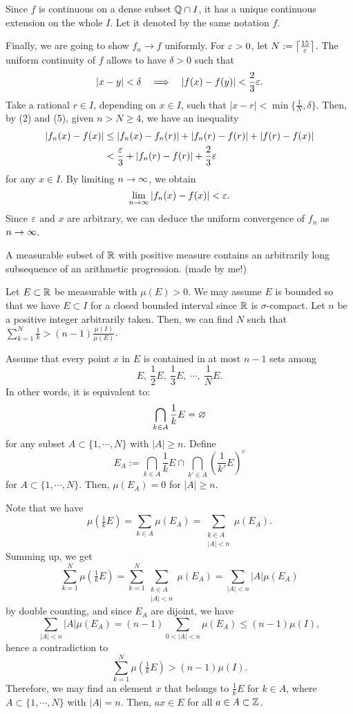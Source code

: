 \documentclass[11pt]{article}
\begin{document}
\begin{sol}
Since $f$ is continuous on a dense subset $\mathbb{Q}\cap I$, it has a unique continuous extension on the whole $I$.
Let it denoted by the same notation $f$.

\Step[4]
Finally, we are going to show $f_n\to f$ uniformly.
For $\varepsilon>0$, let $N:=\left\lceil\frac{15}{\varepsilon}\right\rceil$.
The uniform continuity of $f$ allows to have $\delta>0$ such that
\begin{align}|x-y|<\delta\impl|f(x)-f(y)|<\frac23\e.\end{align}
Take a rational $r\in I$, depending on $x\in I$, such that $|x-r|<\min\{\frac1N,\delta\}$.
Then, by (2) and (5), given $n>N\ge4$, we have an inequality
\begin{align*}
|f_n(x)-f(x)|&\le|f_n(x)-f_n(r)|+|f_n(r)-f(r)|+|f(r)-f(x)|\\
&<\frac{\varepsilon}3+|f_n(r)-f(r)|+\frac23\varepsilon
\end{align*}
for any $x\in I$.
By limiting $n\to\oo$, we obtain
\[\lim_{n\to\oo}|f_n(x)-f(x)|<\e.\]
Since $\varepsilon$ and $x$ are arbitrary, we can deduce the uniform convergence of $f_n$ as $n\to\oo$.
\end{sol}


\clearpage
\begin{prb}
A measurable subset of $\mathbb{R}$ with positive measure contains an arbitrarily long subsequence of an arithmetic progression. (made by me!)
\end{prb}
\begin{sol}
Let $E\subset\mathbb{R}$ be measurable with $\mu(E)>0$. We may assume $E$ is bounded so that we have $E\subset I$ for a closed bounded interval since $\mathbb{R}$ is $\sigma$-compact.
Let $n$ be a positive integer arbitrarily taken. Then, we can find $N$ such that $\sum_{k=1}^N\frac1k>(n-1)\frac{\mu(I)}{\mu(E)}$.

Assume that every point $x$ in $E$ is contained in at most $n-1$ sets among
\[E,\ \frac12E,\ \frac13E,\ \cdots,\ \frac1NE.\]
In other words, it is equivalent to:
\[\bigcap_{k\in A}\frac1kE=\varnothing\]
for any subset $A\subset\{1,\cdots,N\}$ with $|A|\ge n$.
Define
\[E_A:=\bigcap_{k\in A}\frac1kE\cap\bigcap_{k'\in A}\left(\frac1{k'}E\right)^c\]
for $A\subset\{1,\cdots,N\}$.
Then, $\mu(E_A)=0$ for $|A|\ge n$.

Note that we have
\[\mu(\tfrac1kE)=\sum_{k\in A}\mu(E_A)=\sum_{\substack{k\in A\\|A|<n}}\mu(E_A).\]
Summing up, we get
\[\sum_{k=1}^N\mu(\tfrac1kE)=\sum_{k=1}^N\sum_{\substack{k\in A\\|A|<n}}\mu(E_A)=\sum_{|A|<n}|A|\mu(E_A)\]
by double counting,
and since $E_A$ are dijoint, we have
\[\sum_{|A|<n}|A|\mu(E_A)=(n-1)\sum_{0<|A|<n}\mu(E_A)\le(n-1)\mu(I),\]
hence a contradiction to
\[\sum_{k=1}^N\mu(\tfrac1kE)>(n-1)\mu(I).\]
Therefore, we may find an element $x$ that belongs to $\frac1kE$ for $k\in A$, where $A\subset\{1,\cdots,N\}$ with $|A|=n$.
Then, $ax\in E$ for all $a\in A\subset\mathbb{Z}$.
\end{sol}
\end{document}
